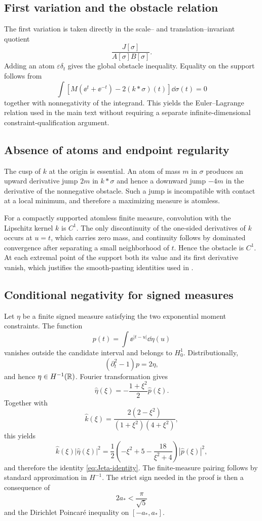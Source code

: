 \subsection{First variation and the obstacle relation}

The first variation is taken directly in the scale-- and translation--invariant quotient
\[
 \frac{J[\sigma]}{A[\sigma]B[\sigma]}.
\]
Adding an atom $\varepsilon\delta_t$ gives the global obstacle inequality.  Equality on the support follows from
\[
 \int\left[M(\ee^t+\ee^{-t})-2(k*\sigma)(t)\right]\dd\sigma(t)=0
\]
together with nonnegativity of the integrand.  This yields the Euler--Lagrange relation used in the main text without requiring a separate infinite-dimensional constraint-qualification argument.

\subsection{Absence of atoms and endpoint regularity}

The cusp of $k$ at the origin is essential.  An atom of mass $m$ in $\sigma$ produces an upward derivative jump $2m$ in $k*\sigma$ and hence a downward jump $-4m$ in the derivative of the nonnegative obstacle.  Such a jump is incompatible with contact at a local minimum, and therefore a maximizing measure is atomless.

For a compactly supported atomless finite measure, convolution with the Lipschitz kernel $k$ is $C^1$.  The only discontinuity of the one-sided derivatives of $k$ occurs at $u=t$, which carries zero mass, and continuity follows by dominated convergence after separating a small neighborhood of $t$.  Hence the obstacle is $C^1$.  At each extremal point of the support both its value and its first derivative vanish, which justifies the smooth-pasting identities used in .

\subsection{Conditional negativity for signed measures}

Let $\eta$ be a finite signed measure satisfying the two exponential moment constraints.  The function
\[
 p(t)=\int\ee^{|t-u|}\dd\eta(u)
\]
vanishes outside the candidate interval and belongs to $H_0^1$.  Distributionally,
\[
 (\partial_t^2-1)p=2\eta,
\]
and hence $\eta\in H^{-1}(\mathbb{R})$.  Fourier transformation gives
\[
 \widehat\eta(\xi)=-\frac{1+\xi^2}{2}\widehat p(\xi).
\]
Together with
\[
 \widehat{k}(\xi)=\frac{2(2-\xi^2)}{(1+\xi^2)(4+\xi^2)},
\]
this yields
\[
 \widehat{k}(\xi)|\widehat\eta(\xi)|^2
 =\frac12\left(-\xi^2+5-\frac{18}{\xi^2+4}\right)|\widehat p(\xi)|^2,
\]
and therefore the identity \eqref{eq:Jeta-identity}.  The finite-measure pairing follows by standard approximation in $H^{-1}$.  The strict sign needed in the proof is then a consequence of
\[
 2a_*<\frac{\pi}{\sqrt5}
\]
and the Dirichlet Poincar\'e inequality on $[-a_*,a_*]$.

